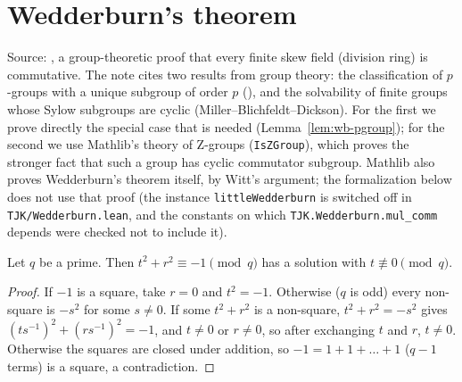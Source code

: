\section{Wedderburn's theorem}\label{sec:wedderburn}
Source: \cite{Wedd}, a group-theoretic proof that every finite skew field (division ring) is commutative. The note cites
two results from group theory: the classification of $p$-groups with a unique subgroup of order $p$ (\cite[p.~189]{Hall}),
and the solvability of finite groups whose Sylow subgroups are cyclic (Miller--Blichfeldt--Dickson). For the first we prove
directly the special case that is needed (Lemma~\ref{lem:wb-pgroup}); for the second we use Mathlib's theory of Z-groups
(\texttt{IsZGroup}), which proves the stronger fact that such a group has cyclic commutator subgroup. Mathlib
also proves Wedderburn's theorem itself, by Witt's argument; the formalization below does not use that proof (the instance
\texttt{littleWedderburn} is switched off in \texttt{TJK/Wedderburn.lean}, and the constants on which
\texttt{TJK.Wedderburn.mul\_comm} depends were checked not to include it).

\begin{lemma}\label{lem:wb-squares}
Let $q$ be a prime. Then $t^2+r^2\equiv-1\pmod q$ has a solution with $t\not\equiv0\pmod q$.
\end{lemma}
\begin{proof}
If $-1$ is a square, take $r=0$ and $t^2=-1$. Otherwise ($q$ is odd) every non-square is $-s^2$ for some $s\ne0$. If some
$t^2+r^2$ is a non-square, $t^2+r^2=-s^2$ gives $(ts^{-1})^2+(rs^{-1})^2=-1$, and $t\ne0$ or $r\ne0$, so after
exchanging $t$ and $r$, $t\ne0$. Otherwise the squares are closed under addition, so $-1=1+1+\dots+1$ ($q-1$ terms) is a
square, a contradiction.
\end{proof}

